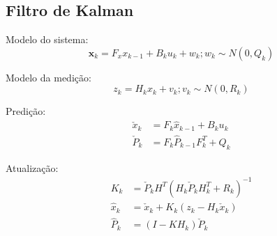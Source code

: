 \subsection{Filtro de Kalman}

Modelo do sistema:
\begin{equation}
\textbf{x}_k = F_x x_{k-1} + B_k u_k + w_k; w_k \sim N(0, Q_k)
\end{equation}

Modelo da medição:
\begin{equation}
z_k = H_k x_k + v_k; v_k \sim N(0, R_k)
\end{equation}

Predição:
\begin{align*}
    \check{x}_k &= F_k \hat{x}_{k-1} + B_k u_k\\
    \check{P}_k &= F_k \hat{P}_{k-1} F^T_k + Q_k
\end{align*}

Atualização:
\begin{align*}
    K_k &= \check{P}_k H^T \left( H_k \check{P}_k H^T_k + R_k\right)^{-1}\\
    \hat{x}_k &= \check{x}_k + K_k\left( z_k - H_k \check{x}_k \right)\\
    \hat{P}_k &= \left(I - KH_k \right)\check{P}_k
\end{align*}